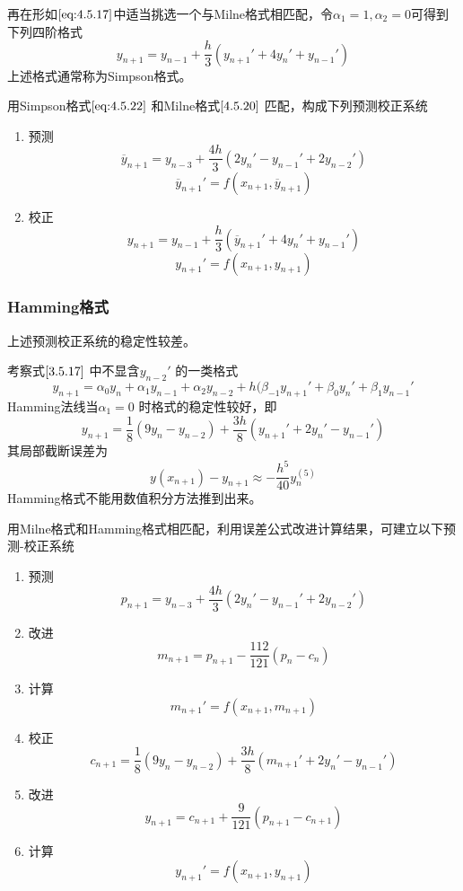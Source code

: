 \documentclass[a4paper]{article}
\begin{document}
再在形如$\ref{eq:4.5.17}$中适当挑选一个与Milne格式相匹配，令$\alpha_1 = 1, \alpha_2=0$可得到下列四阶格式
\[
y_{n+1} = y_{n-1} + \frac{h}{3}(y_{n+1}' + 4y_{n}' + y_{n-1}') \tag{4.5.22} \label{eq:4.5.22} 
\] 
上述格式通常称为Simpson格式。

用Simpson格式$\ref{eq:4.5.22}$ 和Milne格式$\ref{4.5.20}$ 匹配，构成下列预测校正系统
\begin{enumerate}
	\item 预测
		\[
			\overline{y}_{n+1} = y_{n-3} + \frac{4h}{3}(2 y_{n}' - y_{n-1}' + 2 y_{n-2}')
		\] 
		\[
			\overline{y}_{n+1}' = f(x_{n+1}, \overline{y}_{n+1})
		\] 
	\item 校正
		\[
			y_{n+1} = y_{n-1} + \frac{h}{3} (\overline{y}_{n+1}' + 4 y_{n}' + y_{n-1}')
		\] 
		\[
			y_{n+1}' = f(x_{n+1}, y_{n+1}) 
		\] 
\end{enumerate}

\subsubsection{Hamming格式}
上述预测校正系统的稳定性较差。

考察式$\ref{3.5.17}$ 中不显含$y_{n-2}'$ 的一类格式
\[
	y_{n+1} = \alpha_0 y_{n} + \alpha_1 y_{n-1} + \alpha_2 y_{n-2} + h(\beta_{-1} y_{n+1}' + \beta_0 y_{n}' + \beta_1 y_{n-1}' \tag{4.5.23} \label{eq:4.5.23} 
\] 
Hamming法线当$\alpha_1 = 0$ 时格式的稳定性较好，即
\[
y_{n+1} = \frac{1}{8} (9 y_{n} - y_{n-2}) + \frac{3h}{8} (y_{n+1}' + 2y_{n}' - y_{n-1}') \tag{4.5.24} \label{eq:4.5.24} 
\] 
其局部截断误差为
\[
y(x_{n+1}) - y_{n+1} \approx -\frac{h^{5}}{40} y_{n}^{(5)} \tag{4.5.25} \label{eq:4.5.25} 
\] 
Hamming格式不能用数值积分方法推到出来。

用Milne格式和Hamming格式相匹配，利用误差公式改进计算结果，可建立以下预测-校正系统
\begin{enumerate}
	\item 预测
		\[
			p_{n+1} = y_{n-3} + \frac{4h}{3} (2 y_{n}' - y_{n-1}' + 2y_{n-2}')
		\] 
	\item 改进
		\[
			m_{n+1} = p_{n+1} - \frac{112}{121}(p_n - c_n)
		\] 
	\item 计算
		\[
			m_{n+1}' = f(x_{n+1}, m_{n+1})
		\] 
	\item 校正
		\[
			c_{n+1} = \frac{1}{8} (9 y_{n} - y_{n-2}) + \frac{3h}{8} (m_{n+1}' + 2 y_{n}' - y_{n-1}')
		\] 
	\item 改进
		\[
			y_{n+1} = c_{n+1} + \frac{9}{121}(p_{n+1} - c_{n+1})
		\] 
	\item 计算
		\[
		y_{n+1}' = f(x_{n+1}, y_{n+1})
		\] 
\end{enumerate}
\end{document}
